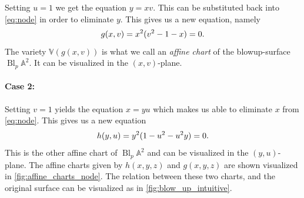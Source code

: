 \documentclass{article}
\newcommand{\A}{\ensuremath{\mathbb{A}}}
\newcommand{\V}{\ensuremath{\mathbb{V}}}
\DeclareMathOperator{\Bl}{Bl}
\begin{document}
\begin{example}
        Setting $u = 1$ we get the equation $y = xv$. This can be substituted
        back into \cref{eq:node} in order to eliminate $y$. This gives us a new
        equation, namely
        \begin{equation}
            \notag
            g(x, v) = x^2(v^2 - 1 - x) = 0.
        \end{equation}
        The variety $\V(g(x, v))$ is what we call an \emph{affine
        chart} of the blowup-surface $\Bl_p\A^2$. It can be
        visualized in the $(x, v)$-plane.

        \paragraph{Case 2:}
        \label{par:case_2}
        
        Setting $v = 1$ yields the equation $x = yu$ which makes us able to
        eliminate $x$ from \cref{eq:node}. This gives us a new equation
        \begin{equation}
            \notag
            h(y, u) = y^2(1 - u^2 - u^2y) = 0.
        \end{equation}
        This is the other affine chart of $\Bl_p\A^2$ and can be visualized in
        the $(y, u)$-plane.  The affine charts given by $h(x, y, z)$ and $g(x,
        y, z)$ are shown visualized in \cref{fig:affine_charts_node}.  The
        relation between these two charts, and the original surface can be
        visualized as in \cref{fig:blow_up_intuitive}.


\end{example}
\end{document}
